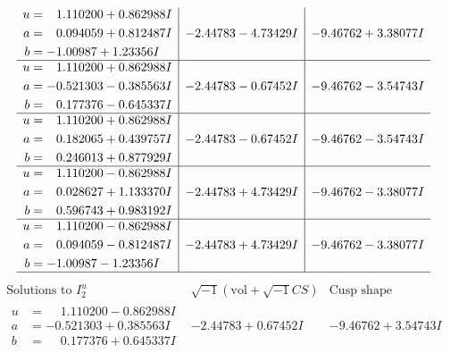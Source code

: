 \documentclass[1p]{elsarticle_modified}
\theoremstyle{definition}
\newcommand{\I}{\sqrt{-1}}
\begin{document}
$$\begin{array}{c|c|c}
\begin{aligned}
u &= \phantom{-}1.110200 + 0.862988 I \\
a &= \phantom{-}0.094059 + 0.812487 I \\
b &= -1.00987 + 1.23356 I\end{aligned}
 & -2.44783 - 4.73429 I & -9.46762 + 3.38077 I \\ \hline\begin{aligned}
u &= \phantom{-}1.110200 + 0.862988 I \\
a &= -0.521303 - 0.385563 I \\
b &= \phantom{-}0.177376 - 0.645337 I\end{aligned}
 & -2.44783 - 0.67452 I & -9.46762 - 3.54743 I \\ \hline\begin{aligned}
u &= \phantom{-}1.110200 + 0.862988 I \\
a &= \phantom{-}0.182065 + 0.439757 I \\
b &= \phantom{-}0.246013 + 0.877929 I\end{aligned}
 & -2.44783 - 0.67452 I & -9.46762 - 3.54743 I \\ \hline\begin{aligned}
u &= \phantom{-}1.110200 - 0.862988 I \\
a &= \phantom{-}0.028627 + 1.133370 I \\
b &= \phantom{-}0.596743 + 0.983192 I\end{aligned}
 & -2.44783 + 4.73429 I & -9.46762 - 3.38077 I \\ \hline\begin{aligned}
u &= \phantom{-}1.110200 - 0.862988 I \\
a &= \phantom{-}0.094059 - 0.812487 I \\
b &= -1.00987 - 1.23356 I\end{aligned}
 & -2.44783 + 4.73429 I & -9.46762 - 3.38077 I\\
 \hline 
 \end{array}$$\newpage$$\begin{array}{c|c|c}  
\text{Solutions to }I^u_{2}& \I (\text{vol} + \sqrt{-1}CS) & \text{Cusp shape}\\
 \hline 
\begin{aligned}
u &= \phantom{-}1.110200 - 0.862988 I \\
a &= -0.521303 + 0.385563 I \\
b &= \phantom{-}0.177376 + 0.645337 I\end{aligned}
 & -2.44783 + 0.67452 I & -9.46762 + 3.54743 I \\ \hline\begin{aligned}

\end{aligned}
\end{array}$$
\end{document}
